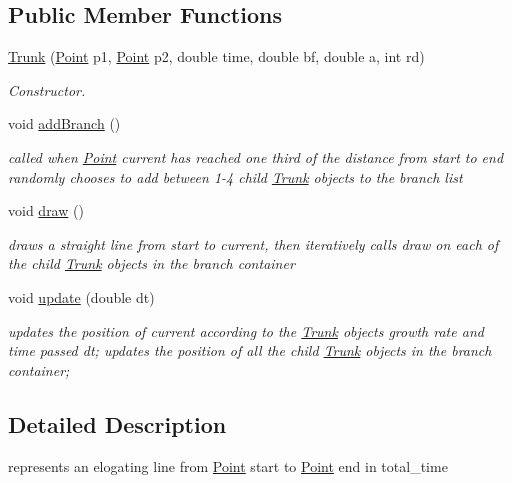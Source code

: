 \subsection*{Public Member Functions}
\begin{DoxyCompactItemize}
\item 
\mbox{\hyperlink{class_trunk_a01d439d00e7e118af0f6e33626e773d1}{Trunk}} (\mbox{\hyperlink{struct_point}{Point}} p1, \mbox{\hyperlink{struct_point}{Point}} p2, double time, double bf, double a, int rd)
\begin{DoxyCompactList}\small\item\em Constructor. \end{DoxyCompactList}\item 
void \mbox{\hyperlink{class_trunk_a04d06f2095aeff41ae3413866c128b8a}{add\+Branch}} ()
\begin{DoxyCompactList}\small\item\em called when \mbox{\hyperlink{struct_point}{Point}} current has reached one third of the distance from start to end randomly chooses to add between 1-\/4 child \mbox{\hyperlink{class_trunk}{Trunk}} objects to the branch list \end{DoxyCompactList}\item 
\mbox{\label{class_trunk_a14013f7f50839be7274e7ea09991df39}} 
void \mbox{\hyperlink{class_trunk_a14013f7f50839be7274e7ea09991df39}{draw}} ()
\begin{DoxyCompactList}\small\item\em draws a straight line from start to current, then iteratively calls draw on each of the child \mbox{\hyperlink{class_trunk}{Trunk}} objects in the branch container \end{DoxyCompactList}\item 
void \mbox{\hyperlink{class_trunk_ab62c99b7a3ad20b53d81b87afa91d28d}{update}} (double dt)
\begin{DoxyCompactList}\small\item\em updates the position of current according to the \mbox{\hyperlink{class_trunk}{Trunk}} objects growth rate and time passed dt; updates the position of all the child \mbox{\hyperlink{class_trunk}{Trunk}} objects in the branch container; \end{DoxyCompactList}\end{DoxyCompactItemize}


\subsection{Detailed Description}
represents an elogating line from \mbox{\hyperlink{struct_point}{Point}} start to \mbox{\hyperlink{struct_point}{Point}} end in total\+\_\+time 

